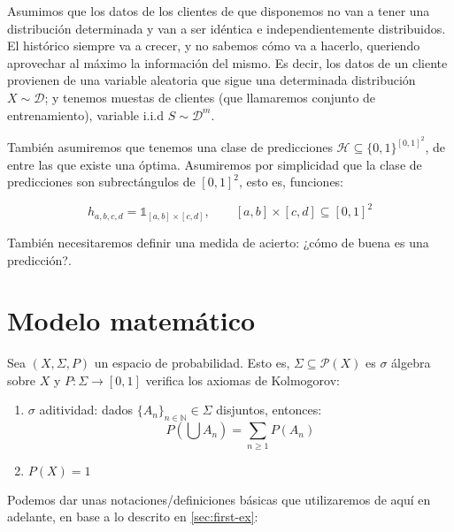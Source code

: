 Asumimos que los datos de los clientes de que disponemos no van a tener una distribución determinada y
van a ser idéntica e independientemente distribuidos. El histórico siempre va a crecer, y no sabemos cómo va a hacerlo, queriendo aprovechar
al máximo la información del mismo. Es decir, los datos de un cliente provienen de una variable aleatoria que sigue una determinada
distribución $X \sim \mathcal{D}$; y tenemos muestas de clientes (que llamaremos conjunto de entrenamiento), variable i.i.d
$S \sim \mathcal{D}^m$. 

También asumiremos que tenemos una clase de predicciones $\mathcal{H} \subseteq \{0,1\}^{[0,1]^2}$, de entre las que existe
una óptima. Asumiremos por simplicidad que la clase de predicciones son subrectángulos de $[0,1]^2$, esto es, funciones:

\[h_{a,b,c,d} = \mathds{1}_{[a,b]\times[c,d]}, \qquad [a,b]\times [c,d] \subseteq [0,1]^2\]


También necesitaremos definir una medida de acierto: ¿cómo de buena es una predicción?.

\section{Modelo matemático}

Sea $(X, \Sigma, P)$ un espacio de probabilidad. Esto es, $\Sigma \subseteq \mathcal{P}(X)$ es $\sigma$ álgebra sobre $X$ y 
$P: \Sigma \rightarrow [0,1]$ verifica los axiomas de Kolmogorov:

\begin{enumerate}[i]
 \item $\sigma$ aditividad: dados $\{A_n\}_{n\in \mathbb{N}} \in \Sigma$ disjuntos, entonces: 
 \[P \left(\bigcup A_n\right) = \sum_{n\ge 1} P(A_n)\]
 \item $P(X) = 1$
\end{enumerate}

Podemos dar unas notaciones/definiciones básicas que utilizaremos de aquí en adelante, en base a lo descrito en \ref{sec:first-ex}:

